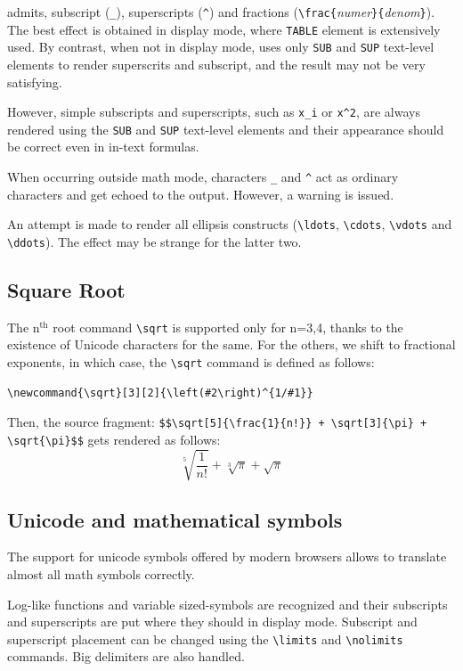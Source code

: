 \hevea{} admits, subscript (\verb+_+), superscripts (\verb+^+) and
fractions (\verb+\frac{+{\it numer}\verb+}{+{\it denom}\verb+}+).
The best effect is obtained in display mode, where \html{}
\verb+TABLE+ element is extensively used.
By contrast, when not in display mode, \hevea{} uses only
\verb+SUB+ and \verb+SUP+ text-level elements to render superscrits
and subscript, and the result may not be very satisfying.

However,
simple subscripts and superscripts, such as \verb+x_i+ or \verb+x^2+,
are always rendered using the \verb+SUB+
and \verb+SUP+ text-level elements and their appearance should be correct
even in in-text formulas.

When occurring outside math mode, characters \verb+_+ and \verb+^+ act as
ordinary characters and get echoed to the output. However, a warning
is issued.

An attempt is made to render all ellipsis constructs (\verb+\ldots+,
\verb+\cdots+, \verb+\vdots+ and \verb+\ddots+). The effect may be
strange for the latter two.

\subsection{Square Root}
\index{\verb+\sqrt+}
The n$^{\mbox{th}}$ root command \verb+\sqrt+ is supported only for n=3,4, thanks to the existence of Unicode characters for the same. For the others, we shift to fractional exponents, in which case, the \verb+\sqrt+ command is
defined as follows:
\begin{verbatim}
\newcommand{\sqrt}[3][2]{\left(#2\right)^{1/#1}}
\end{verbatim}
\begin{htmlonly}
Then, the source
fragment: \verb"$$\sqrt[5]{\frac{1}{n!}} + \sqrt[3]{\pi} + \sqrt{\pi}$$" gets rendered
as follows:
$$
\sqrt[5]{\frac{1}{n!}} + \sqrt[3]{\pi} + \sqrt{\pi}
$$
\end{htmlonly}

\subsection{Unicode and mathematical symbols}

The support for unicode symbols offered by modern browsers allows to
translate almost all math symbols correctly.

Log-like functions and variable sized-symbols are recognized and their
subscripts and superscripts are put where they should in display mode.
Subscript and superscript placement can be changed using the
\verb+\limits+ and \verb+\nolimits+ commands.
Big delimiters are also handled.

